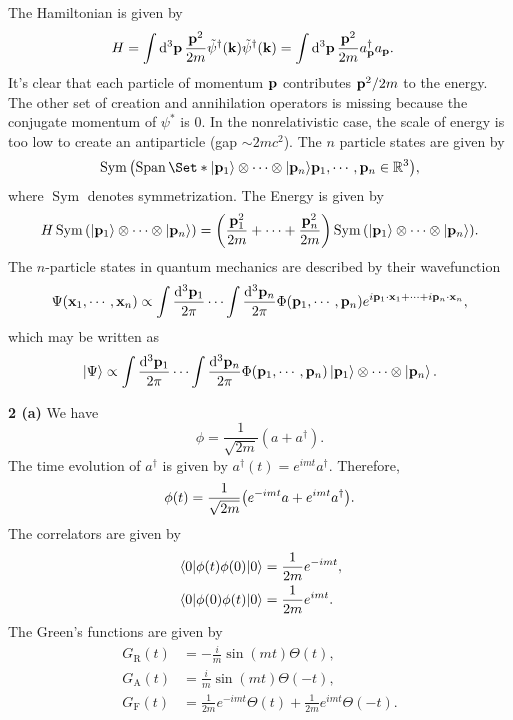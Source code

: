 \documentclass{article}
\makeatletter
\newcommand*{\shifttext}[1]{%
  \settowidth{\@tempdima}{#1}%
  \hspace{-\@tempdima}#1%
}
\newcommand{\plabel}[1]{%
\shifttext{\textbf{#1}\quad}%
}
\newcommand{\prule}{%
\begin{center}%
\hdashrule[0.5ex]{.99\linewidth}{1pt}{1pt 2.5pt}%
\end{center}%
}
\makeatother
\begin{document}
The Hamiltonian is given by
\begin{align*}
    H &= \int \dd{^3\vb{p}} \frac{\vb{p}^2}{2m} \tilde{\psi}^\dagger(\vb{k})\tilde{\psi}^\dagger(\vb{k}) = \int \dd{^3\vb{p}} \frac{\vb{p}^2}{2m} a_{\vb{p}}^\dagger a_{\vb{p}}.
\end{align*}
It's clear that each particle of momentum $\vb{p}$ contributes $\vb{p}^2/2m$ to the energy.
The other set of creation and annihilation operators is missing because the conjugate momentum of $\psi^*$ is $0$.
In the nonrelativistic case, the scale of energy is too low to create an antiparticle (gap $\sim 2mc^2$).
The $n$ particle states are given by
\[ \operatorname{Sym}\qty(\operatorname{Span}\Set*{\ket{\vb{p}_1}\otimes \cdots \otimes\ket{\vb{p}_n}}{\vb{p}_1,\cdots,\vb{p}_n\in\mathbb{R}^3}), \]
where $\operatorname{Sym}$ denotes symmetrization.
The Energy is given by
\[ H \operatorname{Sym}\qty(\ket{\vb{p}_1}\otimes \cdots \otimes\ket{\vb{p}_n}) = \qty(\frac{\vb{p}_1^2}{2m} + \cdots + \frac{\vb{p}_n^2}{2m})\operatorname{Sym}\qty(\ket{\vb{p}_1}\otimes \cdots \otimes\ket{\vb{p}_n}). \]
The $n$-particle states in quantum mechanics are described by their wavefunction
\[ \Psi(\vb{x}_1,\cdots,\vb{x}_n) \propto \int \frac{\dd{^3 \vb{p}_1}}{2\pi} \cdots \int \frac{\dd{^3 \vb{p}_n}}{2\pi} \Phi(\vb{p}_1,\cdots,\vb{p}_n) e^{i\vb{p}_1\cdot \vb{x}_1 + \cdots + i \vb{p}_n\cdot \vb{x}_n}, \]
which may be written as
\[ \ket{\Psi} \propto \int \frac{\dd{^3 \vb{p}_1}}{2\pi} \cdots \int \frac{\dd{^3 \vb{p}_n}}{2\pi} \Phi(\vb{p}_1,\cdots,\vb{p}_n) \ket{\vb{p}_1}\otimes \cdots \otimes\ket{\vb{p}_n}. \]

\prule

\plabel{2 (a)}%
We have
\[ \phi = \frac{1}{\sqrt{2m}}(a + a^\dagger). \]
The time evolution of $a^\dagger$ is given by $a^\dagger(t) = e^{imt} a^\dagger$.
Therefore,
\[ \phi(t) = \frac{1}{\sqrt{2m}}\qty(e^{-imt} a + e^{imt} a^\dagger). \]
The correlators are given by
\begin{align*}
    \ev{\phi(t)\phi(0)}{0} &= \frac{1}{2m} e^{-imt}, \\
    \ev{\phi(0)\phi(t)}{0} &= \frac{1}{2m} e^{imt}.
\end{align*}
The Green's functions are given by
\begin{align*}
    G_{\mathrm{R}}(t) &= -\frac{i}{m}\sin(mt) \Theta(t), \\
    G_{\mathrm{A}}(t) &= \frac{i}{m}\sin(mt) \Theta(-t), \\
    G_{\mathrm{F}}(t) &= \frac{1}{2m} e^{-imt}\Theta(t) + \frac{1}{2m} e^{imt} \Theta(-t).
\end{align*}
\end{document}

